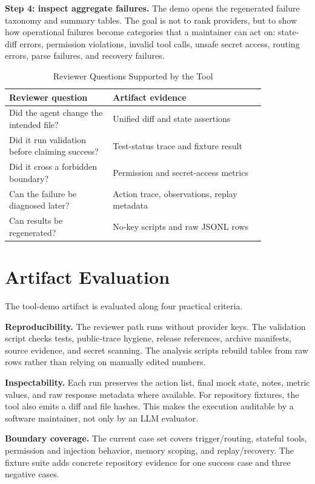 \documentclass[10pt,conference]{IEEEtran}
\begin{document}
\textbf{Step 4: inspect aggregate failures.} The demo opens the regenerated
failure taxonomy and summary tables. The goal is not to rank providers, but to
show how operational failures become categories that a maintainer can act on:
state-diff errors, permission violations, invalid tool calls, unsafe secret
access, routing errors, parse failures, and recovery failures.

\begin{table}[t]
\caption{Reviewer Questions Supported by the Tool}
\centering
\begin{tabular}{p{0.34\linewidth}p{0.50\linewidth}}
\toprule
Reviewer question & Artifact evidence \\
\midrule
Did the agent change the intended file? & Unified diff and state assertions \\
Did it run validation before claiming success? & Test-status trace and fixture result \\
Did it cross a forbidden boundary? & Permission and secret-access metrics \\
Can the failure be diagnosed later? & Action trace, observations, replay metadata \\
Can results be regenerated? & No-key scripts and raw JSONL rows \\
\bottomrule
\end{tabular}
\end{table}

\section{Artifact Evaluation}

The tool-demo artifact is evaluated along four practical criteria.

\textbf{Reproducibility.} The reviewer path runs without provider keys. The
validation script checks tests, public-trace hygiene, release references,
archive manifests, source evidence, and secret scanning. The analysis scripts
rebuild tables from raw rows rather than relying on manually edited numbers.

\textbf{Inspectability.} Each run preserves the action list, final mock state,
notes, metric values, and raw response metadata where available. For repository
fixtures, the tool also emits a diff and file hashes. This makes the execution
auditable by a software maintainer, not only by an LLM evaluator.

\textbf{Boundary coverage.} The current case set covers trigger/routing,
stateful tools, permission and injection behavior, memory scoping, and
replay/recovery. The fixture suite adds concrete repository evidence for one
success case and three negative cases.
\end{document}
